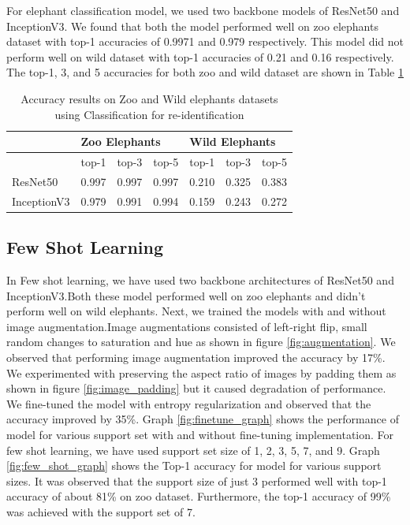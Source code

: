 \documentclass[10pt,twocolumn,letterpaper]{article}
\begin{document}
For elephant classification model, we used two backbone models of ResNet50 and InceptionV3. We found that both the model performed well on zoo elephants dataset with top-1 accuracies of 0.9971 and 0.979 respectively. This model did not perform well on wild dataset with top-1 accuracies of 0.21 and 0.16 respectively. The top-1, 3, and 5 accuracies for both zoo and wild dataset are shown in Table \ref{tab:clf-results}

\begin{table}[]
\begin{tabular}{@{}lllllll@{}}
\toprule
                                 & \multicolumn{3}{l}{Zoo Elephants}          & \multicolumn{3}{l}{Wild Elephants} \\ \midrule
\multicolumn{1}{l|}{}            & top-1 & top-3 & \multicolumn{1}{l|}{top-5} & top-1      & top-3     & top-5     \\
\multicolumn{1}{l|}{ResNet50}    & 0.997 & 0.997 & \multicolumn{1}{l|}{0.997} & 0.210      & 0.325     & 0.383     \\
\multicolumn{1}{l|}{InceptionV3} & 0.979 & 0.991 & \multicolumn{1}{l|}{0.994} & 0.159      & 0.243     & 0.272     \\ \bottomrule
\end{tabular}
\caption{Accuracy results on Zoo and Wild elephants datasets using Classification for re-identification}
\label{tab:clf-results}
\end{table}



\subsection{Few Shot Learning}

In Few shot learning, we have used two backbone architectures of ResNet50 and InceptionV3.Both these model performed well on zoo elephants and didn't perform well on wild elephants. 
Next, we trained the models with and without image augmentation.Image augmentations consisted of left-right flip, small random changes to saturation and hue as shown in figure \ref{fig:augmentation}. We observed that performing image augmentation improved the accuracy by 17\%. We experimented with preserving the aspect ratio of images by padding them as shown in figure \ref{fig:image_padding} but it caused degradation of performance. We fine-tuned the model with entropy regularization and observed that the accuracy improved by 35\%. Graph \ref{fig:finetune_graph} shows the performance of model for various support set with and without fine-tuning implementation. For few shot learning, we have used support set size of 1, 2, 3, 5, 7, and 9. Graph \ref{fig:few_shot_graph} shows the Top-1 accuracy for model for various support sizes. It was observed that the support size of just 3 performed well with top-1 accuracy of about 81\% on zoo dataset. Furthermore, the top-1 accuracy of 99\% was achieved with the support set of 7. 
\end{document}
